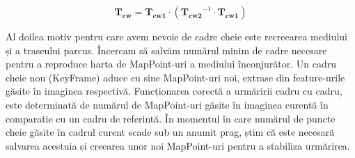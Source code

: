 \documentclass[12pt,a4paper]{report}
\begin{document}
\begin{equation}
\mathbf{T_{cw}} = \mathbf{T_{cw1}} \cdot \left( \mathbf{T_{cw2}}^{-1} \cdot \mathbf{T_{cw1}} \right)
\end{equation} 

Al doilea motiv pentru care avem nevoie de cadre cheie este recreearea mediului și a traseului parcus.
Încercam să salvăm numărul minim de cadre necesare pentru a reproduce harta de MapPoint-uri a mediului
înconjurător. Un cadru cheie nou (KeyFrame) aduce cu sine MapPoint-uri noi, extrase din feature-urile
găsite în imaginea respectivă. Funcționarea corectă a urmăririi cadru cu cadru, este determinată de numărul de 
MapPoint-uri găsite în imaginea curentă în comparatie cu un cadru de referintă. În momentul 
în care numărul de puncte cheie găsite în cadrul curent scade sub un anumit prag, știm că este
necesară salvarea acestuia și creearea unor noi MapPoint-uri pentru a stabiliza urmărirea. 
\end{document}
